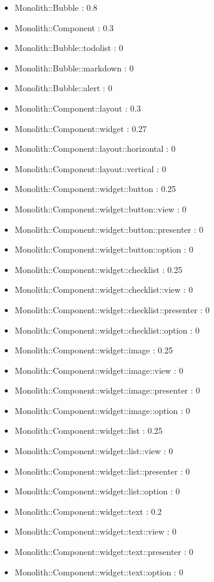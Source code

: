\begin{itemize}
\item Monolith::Bubble : 0.8
\item Monolith::Component : 0.3
\item Monolith::Bubble::todolist : 0
\item Monolith::Bubble::markdown : 0
\item Monolith::Bubble::alert : 0
\item Monolith::Component::layout : 0.3
\item Monolith::Component::widget : 0.27
\item Monolith::Component::layout::horizontal : 0
\item Monolith::Component::layout::vertical : 0
\item Monolith::Component::widget::button : 0.25
\item Monolith::Component::widget::button::view : 0
\item Monolith::Component::widget::button::presenter : 0
\item Monolith::Component::widget::button::option : 0
\item Monolith::Component::widget::checklist : 0.25
\item Monolith::Component::widget::checklist::view : 0
\item Monolith::Component::widget::checklist::presenter : 0
\item Monolith::Component::widget::checklist::option : 0
\item Monolith::Component::widget::image : 0.25
\item Monolith::Component::widget::image::view : 0
\item Monolith::Component::widget::image::presenter : 0
\item Monolith::Component::widget::image::option : 0
\item Monolith::Component::widget::list : 0.25
\item Monolith::Component::widget::list::view : 0
\item Monolith::Component::widget::list::presenter : 0
\item Monolith::Component::widget::list::option : 0
\item Monolith::Component::widget::text : 0.2
\item Monolith::Component::widget::text::view : 0
\item Monolith::Component::widget::text::presenter : 0
\item Monolith::Component::widget::text::option : 0
\end{itemize}

